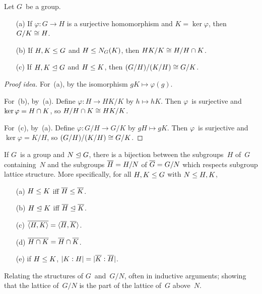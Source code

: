 \begin{thm}
Let \(G\)~be a group. 
\begin{enumerate}[itemsep=0pt]
\item[(a)] If \(\varphi:G\to H\) is a surjective homomorphism and \(K=\ker\varphi\), then \(G/K\iso H\).
\item[(b)] If \(H,K\subgroupeq G\) and \(H\subgroupeq N_G(K)\), then \(HK/K\iso H/H\sect K\).
\item[(c)] If \(H,K\normsubgroupeq G\) and \(H\subgroupeq K\), then \((G/H)/(K/H)\iso G/K\).
\end{enumerate}
\end{thm}
\begin{proof}[Proof idea]
For~(a), by the isomorphism \(gK\mapsto\varphi(g)\).

For~(b), by~(a). Define \(\varphi:H\to HK/K\) by \(h\mapsto hK\). Then \(\varphi\)~is surjective and \(\ker\varphi=H\sect K\), so \(H/H\sect K\iso HK/K\).

For~(c), by~(a). Define \(\varphi:G/H\to G/K\) by \(gH\mapsto gK\). Then \(\varphi\)~is surjective and \(\ker\varphi=K/H\), so \((G/H)/(K/H)\iso G/K\).
\end{proof}

\begin{thm}
If \(G\)~is a group and \(N\normsubgroupeq G\), there is a bijection between the subgroups~\(H\) of~\(G\) containing~\(N\) and the subgroups \(\res{H}=H/N\) of \(\res{G}=G/N\) which respects subgroup lattice structure. More specifically, for all \(H,K\subgroupeq G\) with \(N\subgroupeq H,K\),
\begin{enumerate}[itemsep=0pt]
\item[(a)] \(H\subgroupeq K\) iff \(\res{H}\subgroupeq\res{K}\).
\item[(b)] \(H\normsubgroupeq K\) iff \(\res{H}\normsubgroupeq\res{K}\).
\item[(c)] \(\res{\groupclosure{H,K}}=\groupclosure{\res{H},\res{K}}\).
\item[(d)] \(\res{H\sect K}=\res{H}\sect\res{K}\).
\item[(e)] if \(H\subgroupeq K\), \(\idx{H}{K}=\idx{\res{H}}{\res{K}}\).
\end{enumerate}
\end{thm}
\begin{app}
Relating the structures of \(G\)~and~\(G/N\), often in inductive arguments; showing that the lattice of~\(G/N\) is the part of the lattice of~\(G\) above~\(N\).
\end{app}

